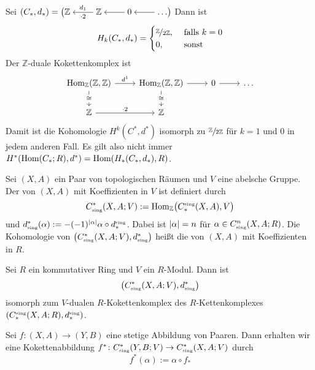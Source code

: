 \begin{beispiel}
	Sei $(C_*,d_*)= \big(\begin{tikzcd}[cramped] \mathbb{Z} & \mathbb{Z} \lar["\cdot 2","d_1"'] & 0 \lar & \ldots \lar \end{tikzcd}\big)$ Dann ist
	\[
		H_k(C_*,d_*) = \begin{cases}
			\nicefrac{\mathbb{Z}}{2 \mathbb{Z}}, &\text{ falls } k =0\\
			0 , & \text{ sonst} 
		\end{cases}
	\]
	Der $\mathbb{Z}$-duale Kokettenkomplex ist
	\[
		\begin{tikzcd}
			 \Hom_{\mathbb{Z}}(\mathbb{Z},\mathbb{Z}) \rar["d^1"] \dar["\cong" description] & \Hom_{\mathbb{Z}}(\mathbb{Z},\mathbb{Z}) \rar \dar["\cong" description] 
			& 0 \rar & \ldots \\
			\mathbb{Z} \rar["\cdot 2"] & \mathbb{Z}
		\end{tikzcd}
	\]
	Damit ist die Kohomologie $H^k(C^*,d^*)$ isomorph zu $\sfrac{\mathbb{Z}}{2 \mathbb{Z}}$ für $k=1$ und $0$ in jedem anderen Fall.
	Es gilt also nicht immer $H^*(\Hom(C_*;R),d^*) =  \Hom \enbrace{H_*(C_*,d_*),R}$.
\end{beispiel}

\begin{definition}[{name=[singulärer Kokettenkomplex]}]
	Sei $(X,A)$ ein Paar von topologischen Räumen und $V$ eine abelsche Gruppe. Der  von $(X,A)$ mit Koeffizienten in $V$ ist definiert durch
	\[
		C^*_\sing(X,A;V) := \Hom_\mathbb{Z} \enbrace[\big]{C_*^\sing(X,A),V}
	\]
	und $d^*_\sing(\alpha) := - (-1)^{\abs{\alpha}} \alpha \circ d_*^\sing$. Dabei ist $\abs{\alpha}=n$ für $\alpha \in C^n_\sing(X,A;R)$. Die 
	Kohomologie von $\enbrace*{C^*_\sing(X,A;V), d^*_\sing}$ heißt die  von $(X,A)$ mit Koeffizienten in $R$.
\end{definition}

\begin{bemerkung}
	Sei $R$ ein kommutativer Ring und $V$ ein $R$-Modul. Dann ist
	\[
		\enbrace*{C^*_\sing(X,A;V), d^*_\sing}
	\]
	isomorph zum $V$-dualen $R$-Kokettenkomplex des $R$-Kettenkomplexes $\enbrace*{C^\sing_*(X,A;R), d^\sing_*}$.
\end{bemerkung}


\begin{definition}[{name=[induzierte Abbildung]}]
	Sei $f \colon (X,A) \to (Y,B)$ eine stetige Abbildung von Paaren. Dann erhalten wir eine Kokettenabbildung $f^* \colon C^*_\sing(Y,B;V) \to C^*_\sing(X,A;V)$ durch
	\[
		f^*(\alpha) := \alpha \circ f_*
	\]
\end{definition}

